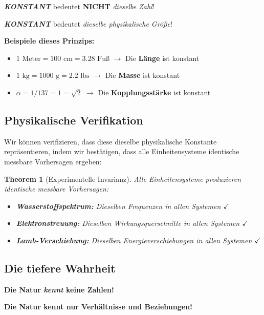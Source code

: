 \documentclass[12pt,a4paper]{article}
\newtheorem{theorem}{Theorem}[section]
\begin{document}
	\begin{tcolorbox}[colback=yellow!5!white,colframe=orange!75!black,title=Fundamentales Prinzip]
		\textit{\textbf{KONSTANT}} bedeutet \textbf{NICHT} \textit{dieselbe Zahl}!
		
		\textit{\textbf{KONSTANT}} bedeutet \textit{dieselbe physikalische Größe}!
	\end{tcolorbox}
	
	\textbf{Beispiele dieses Prinzips:}
	\begin{itemize}
		\item $1\text{ Meter} = 100\text{ cm} = 3.28\text{ Fuß}$ $\rightarrow$ Die \textbf{Länge} ist konstant
		\item $1\text{ kg} = 1000\text{ g} = 2.2\text{ lbs}$ $\rightarrow$ Die \textbf{Masse} ist konstant
		\item $\alpha = 1/137 = 1 = \sqrt{2}$ $\rightarrow$ Die \textbf{Kopplungsstärke} ist konstant
	\end{itemize}
	
	\subsection{Physikalische Verifikation}
	
	Wir können verifizieren, dass diese dieselbe physikalische Konstante repräsentieren, indem wir bestätigen, dass alle Einheitensysteme identische messbare Vorhersagen ergeben:
	
	\begin{theorem}[Experimentelle Invarianz]
		Alle Einheitensysteme produzieren identische messbare Vorhersagen:
		\begin{itemize}
			\item \textbf{Wasserstoffspektrum:} Dieselben Frequenzen in allen Systemen $\checkmark$
			\item \textbf{Elektronstreuung:} Dieselben Wirkungsquerschnitte in allen Systemen $\checkmark$
			\item \textbf{Lamb-Verschiebung:} Dieselben Energieverschiebungen in allen Systemen $\checkmark$
		\end{itemize}
	\end{theorem}
	
	\subsection{Die tiefere Wahrheit}
	
	\begin{tcolorbox}[colback=green!5!white,colframe=green!75!black,title=Naturs wahre Sprache]
		\textbf{Die Natur \textit{kennt} keine Zahlen!}
		
		\textbf{Die Natur kennt nur Verhältnisse und Beziehungen!}
	\end{tcolorbox}
	
\end{document}
